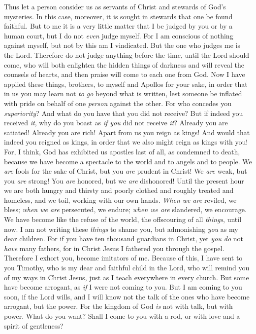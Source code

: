\begin{biblechapter} %
 Thus let a person consider us as servants of Christ and stewards of God’s mysteries.
\verse In this case, moreover, it is sought in stewards that one be found faithful.
\verse But to me it is a very little matter that I be judged by you or by a human court, but I do not \textit{even} judge myself.
\verse For I am conscious of nothing against myself, but not by this am I vindicated. But the one who judges me is the Lord.
\verse Therefore do not judge anything before the time, until the Lord should come, who will both enlighten the hidden things of darkness and will reveal the counsels of hearts, and then praise will come to each one from God.
 Now I have applied these things, brothers, to myself and Apollos for your sake, in order that in us you may learn not \textit{to go} beyond what is written, lest someone be inflated with pride on behalf of one \textit{person} against the other.
\verse For who concedes you \textit{superiority}? And what do you have that you did not receive? But if indeed you received \textit{it}, why do you boast as \textit{if you} did not receive \textit{it}?
\verse Already you are satiated! Already you are rich! Apart from us you reign as kings! And would that indeed you reigned as kings, in order that we also might reign as kings with you!
\verse For, I think, God has exhibited us apostles last of all, as condemned to death, because we have become a spectacle to the world and to angels and to people.
\verse We \textit{are} fools for the sake of Christ, but you \textit{are} prudent in Christ! We \textit{are} weak, but you \textit{are} strong! You \textit{are} honored, but we \textit{are} dishonored!
\verse Until the present hour we are both hungry and thirsty and poorly clothed and roughly treated and homeless,
\verse and we toil, working with our own hands. \textit{When we are} reviled, we bless; \textit{when we are} persecuted, we endure;
\verse \textit{when we are} slandered, we encourage. We have become like the refuse of the world, the offscouring of all \textit{things}, until now.
 I am not writing these \textit{things} to shame you, but admonishing \textit{you} as my dear children.
\verse For if you have ten thousand guardians in Christ, yet \textit{you do} not \textit{have} many fathers, for in Christ Jesus I fathered you through the gospel.
\verse Therefore I exhort you, become imitators of me.
\verse Because of this, I have sent to you Timothy, who is my dear and faithful child in the Lord, who will remind you of my ways in Christ Jesus, just as I teach everywhere in every church.
\verse But some have become arrogant, as \textit{if} I were not coming to you.
\verse But I am coming to you soon, if the Lord wills, and I will know not the talk of the ones who have become arrogant, but the power.
\verse For the kingdom of God \textit{is} not with talk, but with power.
\verse What do you want? Shall I come to you with a rod, or with love and a spirit of gentleness?
\end{biblechapter}

